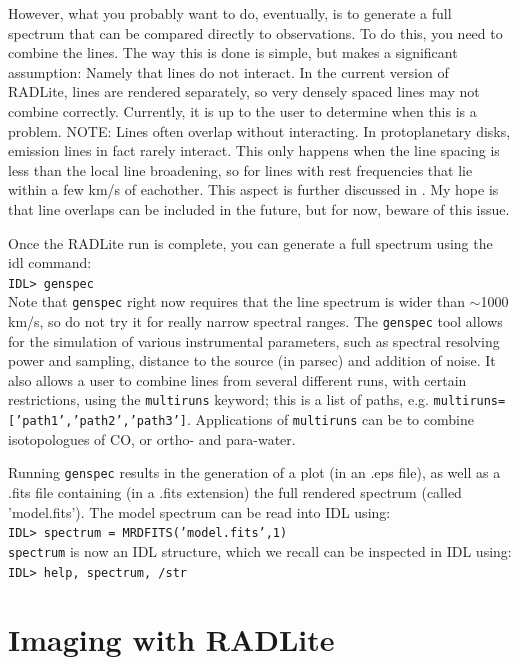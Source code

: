 \documentclass[11pt]{article}
\begin{document}
However, what you probably want to do, eventually, is to generate a full spectrum that can be compared directly
to observations. To do this, you need to combine the lines. The way this is done is simple, but makes a significant assumption: Namely that lines do
not interact. In the current version of RADLite, lines are rendered separately, so very densely spaced lines may not combine correctly. Currently, 
it is up to the user to determine when this is a problem. NOTE: Lines often overlap without interacting. In protoplanetary disks, emission lines in fact rarely
interact. This only happens when the line spacing is less than the local line broadening, so for lines with rest frequencies that lie within a few km/s of eachother. 
This aspect is further discussed in \cite{Pontoppidan09}. My hope is that line overlaps can be included in the future, but for now, beware of this issue. 

Once the RADLite run is complete, you can generate a full spectrum using the idl command:\\
{\tt IDL> genspec}\\

Note that {\tt genspec} right now requires that the line spectrum is wider than $\sim$1000\,km/s, so do not try it for really narrow spectral ranges. The {\tt genspec}
tool allows for the simulation of various instrumental parameters, such as spectral resolving power and sampling, distance to the source (in parsec) and addition of noise.
It also allows a user to combine lines from several different runs, with certain restrictions, using the {\tt multiruns} keyword; this is a list of paths, e.g. {\tt multiruns=['path1','path2','path3']}.
Applications of {\tt multiruns} can be to combine isotopologues of CO, or ortho- and para-water. 

Running {\tt genspec} results in the generation of a plot (in an .eps file), as well as a .fits file containing (in a .fits extension) the full rendered spectrum (called 'model.fits'). 
The model spectrum can be read into IDL using:\\
{\tt IDL> spectrum = MRDFITS('model.fits',1)} \\
{\tt spectrum} is now an IDL structure, which we recall can be inspected in IDL using:\\
{\tt IDL> help, spectrum, /str}

\section{Imaging with RADLite}
\end{document}

